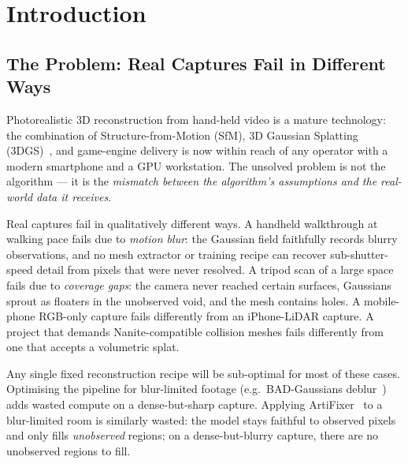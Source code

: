 \documentclass[a4paper,11pt]{report}
\begin{document}
\tableofcontents
\listoffigures
\listoftables

\cleardoublepage
{}

\chapter{Introduction}
\label{chap:intro}

\section{The Problem: Real Captures Fail in Different Ways}
\label{sec:intro:problem}

Photorealistic 3D reconstruction from hand-held video is a mature technology: the
combination of Structure-from-Motion (SfM), 3D Gaussian Splatting
(3DGS)~\cite{kerbl2023_3dgs}, and game-engine delivery is now within reach of any
operator with a modern smartphone and a GPU workstation.  The unsolved problem is
not the algorithm --- it is the \emph{mismatch between the algorithm's assumptions
and the real-world data it receives}.

Real captures fail in qualitatively different ways.  A handheld walkthrough at
walking pace fails due to \emph{motion blur}: the Gaussian field faithfully records
blurry observations, and no mesh extractor or training recipe can recover
sub-shutter-speed detail from pixels that were never resolved.  A tripod scan of a
large space fails due to \emph{coverage gaps}: the camera never reached certain
surfaces, Gaussians sprout as floaters in the unobserved void, and the mesh
contains holes.  A mobile-phone RGB-only capture fails differently from an
iPhone-LiDAR capture.  A project that demands Nanite-compatible collision meshes
fails differently from one that accepts a volumetric splat.

Any single fixed reconstruction recipe will be sub-optimal for most of these cases.
Optimising the pipeline for blur-limited footage (e.g.\ BAD-Gaussians
deblur~\cite{zhao2024_badgaussians}) adds wasted compute on a dense-but-sharp
capture.  Applying ArtiFixer~\cite{delutio2026_artifixer} to a blur-limited room is
similarly wasted: the model stays faithful to observed pixels and only fills
\emph{unobserved} regions; on a dense-but-blurry capture, there are no unobserved
regions to fill.
\end{document}
